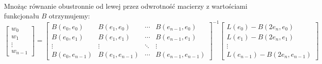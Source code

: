 \documentclass[a4paper,12pt]{article}
\begin{document}
    Mnożąc równanie obustronnie od lewej przez odwrotność macierzy z wartościami funkcjonału \(B\) otrzymujemy:
    {\scriptsize
    \begin{equation}
        \begin{bmatrix}
            w_0 \\
            w_1 \\
            \vdots \\
            w_{n-1}
        \end{bmatrix}
        =
        \begin{bmatrix}
            B\left(e_0, e_0\right) & B\left(e_1, e_0\right) & \cdots & B\left(e_{n-1}, e_0\right) \\
            B\left(e_0, e_1\right) & B\left(e_1, e_1\right) & \cdots & B\left(e_{n-1}, e_1\right) \\
            \vdots & \vdots & \ddots & \vdots \\
            B\left(e_0, e_{n-1}\right) & B\left(e_1, e_{n-1}\right) & \cdots & B\left(e_{n-1}, e_{n-1}\right)
        \end{bmatrix}
        ^{-1}
        \begin{bmatrix}
            L\left(e_0\right)-B\left(2e_n, e_0\right) \\
            L\left(e_1\right)-B\left(2e_n, e_1\right) \\
            \vdots \\
            L\left(e_{n-1}\right)-B\left(2e_n, e_{n-1}\right)
        \end{bmatrix} \label{matrix_solution}
    \end{equation}
    }
\end{document}
